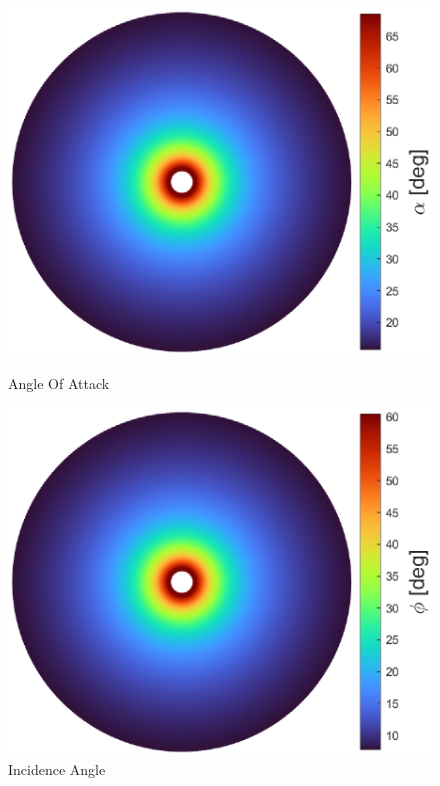 {\begin{figure}[!htb]
    \centering
    \begin{minipage}{.49\textwidth}
      \centering
      \includegraphics[width=\textwidth]{Figures/comp_method/sim_B/alpha.eps}
      \caption[Angle Of Attack]{Angle Of Attack}
      \label{fig:imagem111}
    \end{minipage}%
    \begin{minipage}{.01\textwidth}
         \hfill
    \end{minipage}
    \begin{minipage}{.49\textwidth}
      \centering
      \includegraphics[width=\textwidth]{Figures/comp_method/sim_B/phi.eps}
      \caption[Incidence angle]{Incidence Angle}
      \label{fig:imagem311}
    \end{minipage}
\end{figure}


}
